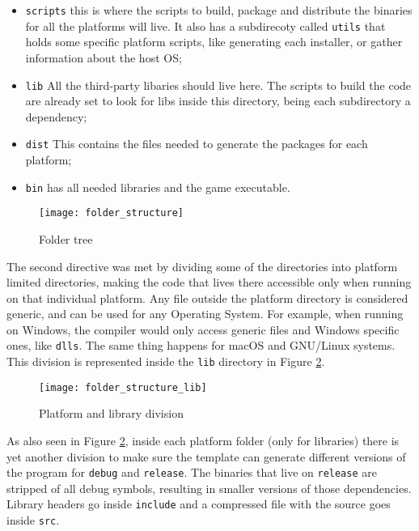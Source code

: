 \begin{itemize}
\item \texttt{scripts} this is where the scripts to build, package and distribute the binaries for all the platforms will live. It also has a subdirecoty called \texttt{utils} that holds some specific platform scripts, like generating each installer, or gather information about the host OS;
\item \texttt{lib} All the third-party libaries should live here. The scripts to build the code are already set to look for libs inside this directory, being each subdirectory a dependency;
\item \texttt{dist} This contains the files needed to generate the packages for each platform;
\item \texttt{bin} has all needed libraries and the game executable.

\end{itemize}

\begin{figure}[h!]
\centering
\texttt{[image: folder\_structure]}
\caption{Folder tree}
\label{fig:folder_structure}
\end{figure}

The second directive was met by dividing some of the directories into platform limited directories, making the code that lives there accessible only when running on that individual platform. Any file outside the platform directory is considered generic, and can be used for any Operating System. For example, when running on Windows, the compiler would only access generic files and Windows specific ones, like \texttt{dlls}. The same thing happens for macOS and GNU/Linux systems. This division is represented inside the \texttt{lib} directory in Figure \ref{fig:folder_structure_lib}.

\begin{figure}[h!]
\centering
\texttt{[image: folder\_structure\_lib]}
\caption{Platform and library division}
\label{fig:folder_structure_lib}
\end{figure}

As also seen in Figure \ref{fig:folder_structure_lib}, inside each platform folder (only for libraries) there is yet another division to make sure the template can generate different versions of the program for \texttt{debug} and \texttt{release}. The binaries that live on \texttt{release} are stripped of all debug symbols, resulting in smaller versions of those dependencies. Library headers go inside \texttt{include} and a compressed file with the source goes inside \texttt{src}.


